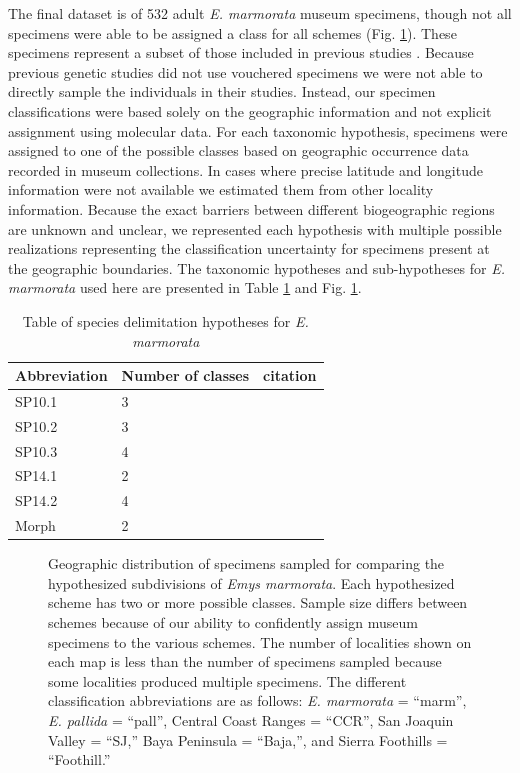 \documentclass[10pt,letterpaper]{article}
\begin{document}
The final dataset is of 532 adult \textit{E. marmorata} museum specimens, though not all specimens were able to be assigned a class for all schemes (Fig. \ref{fig:map}). These specimens represent a subset of those included in previous studies \cite{Angielczyk2007,Angielczyk2011,Angielczyk2013a}. Because previous genetic studies did not use vouchered specimens \cite{Spinks2005,Spinks2010,Spinks2014} we were not able to directly sample the individuals in their studies. Instead, our specimen classifications were based solely on the geographic information and not explicit assignment using molecular data. For each taxonomic hypothesis, specimens were assigned to one of the possible classes based on geographic occurrence data recorded in museum collections. In cases where precise latitude and longitude information were not available we estimated them from other locality information. Because the exact barriers between different biogeographic regions are unknown and unclear, we represented each hypothesis with multiple possible realizations representing the classification uncertainty for specimens present at the geographic boundaries. The taxonomic hypotheses and sub-hypotheses for \textit{E. marmorata} used here are presented in Table \ref{tab:hypotheses} and Fig. \ref{fig:map}.

\begin{table}
  \centering
    \caption{Table of species delimitation hypotheses for \textit{E. marmorata}}
    \begin{tabular}{l l l }
      \hline
      Abbreviation & Number of classes & citation \\
      \hline
      SP10.1 & 3 & \cite{Spinks2010} \\
      SP10.2 & 3 & \cite{Spinks2010} \\
      SP10.3 & 4 & \cite{Spinks2010} \\
      SP14.1 & 2 & \cite{Spinks2014} \\
      SP14.2 & 4 & \cite{Spinks2014} \\
      Morph & 2 & \cite{Spinks2010} \\
      \hline
    \end{tabular}
    \label{tab:hypotheses}
\end{table}

\afterpage{\clearpage}
\begin{figure}[ht]
  \centering
  \caption{Geographic distribution of specimens sampled for comparing the hypothesized subdivisions of \textit{Emys marmorata}. Each hypothesized scheme has two or more possible classes. Sample size differs between schemes because of our ability to confidently assign museum specimens to the various schemes. The number of localities shown on each map is less than the number of specimens sampled because some localities produced multiple specimens. The different classification abbreviations are as follows: \textit{E. marmorata} = ``marm'', \textit{E. pallida} = ``pall'', Central Coast Ranges = ``CCR'', San Joaquin Valley = ``SJ,'' Baya Peninsula = ``Baja,'', and Sierra Foothills = ``Foothill.''}
  \label{fig:map}
\end{figure}
\end{document}
